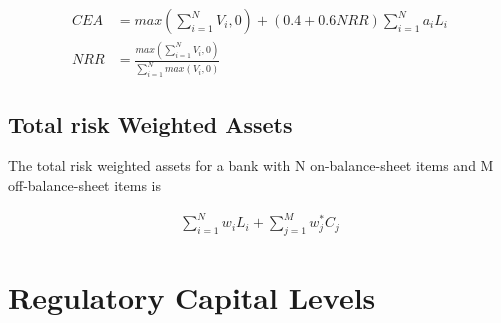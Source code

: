 \documentclass[12pt]{article}
\begin{document}
\begin{align*}
  CEA & = max(\sum_{i=1}^{N} V_{i}, 0) + (0.4 + 0.6 NRR) \sum_{i=1}^{N} a_{i} L_{i} \\
  NRR & = \frac{ max(\sum_{i=1}^{N} V_{i}, 0) }{  \sum_{i=1}^{N} max(V_{i}, 0) }
\end{align*}

\subsection{Total risk Weighted Assets}

The total risk weighted assets for a bank with N on-balance-sheet items and M off-balance-sheet items is

\begin{align*}
  \sum_{i=1}^{N} w_{i} L_{i} + \sum_{j=1}^{M} w_{j}^{*} C_{j}
\end{align*}

\section*{Regulatory Capital Levels}
\end{document}
